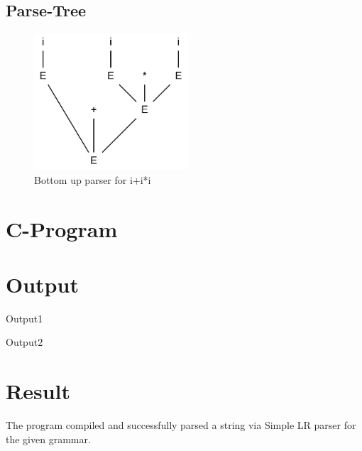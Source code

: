 \subsection{Parse-Tree}
\begin{figure}[!h]
	\centering
	\includegraphics[height=2in]{../EXP7/parse_tree.png}
	\caption{Bottom up parser for i+i*i}
\end{figure}

\break
\section{C-Program}


\section{Output}
Output1

Output2


\section{Result}
The program compiled and successfully parsed a string via Simple LR parser for the given grammar.